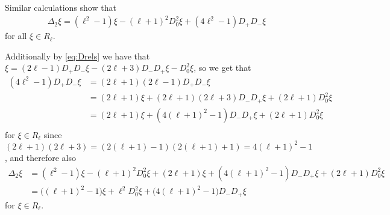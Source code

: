 Similar calculations show that
\begin{align*}
  \Delta_2 \xi = (\ell^2-1)\xi - (\ell+1)^2D_0^2 \xi + (4\ell^2-1)D_+D_-\xi
\end{align*}
for all $\xi \in R_\ell$.

Additionally by \cref{eq:Drels} we have that $\xi= (2\ell-1)D_+D_- \xi - (2\ell+3)D_-D_+\xi - D_0^2\xi$, so we get that
\begin{align*}
  (4\ell^2-1)D_+D_-\xi &= (2\ell+1)(2\ell-1)D_+D_-\xi \\
                       &= (2\ell+1)\xi + (2\ell+1)(2\ell+3)D_-D_+\xi + (2\ell+1)D_0^2\xi \\
                       &= (2\ell+1)\xi + (4(\ell+1)^2-1)D_-D_+\xi + (2\ell+1)D_0^2\xi \\
\end{align*}
for $\xi\in R_\ell$ since $(2\ell+1)(2\ell+3)=(2(\ell+1)-1)(2(\ell+1)+1)=4(\ell+1)^2-1$, and therefore also
\begin{align*}
  \Delta_2 \xi &= (\ell^2-1)\xi - (\ell+1)^2D_0^2 \xi + (2\ell+1)\xi + (4(\ell+1)^2-1)D_-D_+\xi + (2\ell+1)D_0^2\xi \\
  &= \bigl((\ell+1)^2-1\bigr)\xi  + \ell^2D_0^2\xi + \bigl(4(\ell+1)^2-1\bigr)D_-D_+\xi
\end{align*}
for $\xi\in R_\ell$. 

